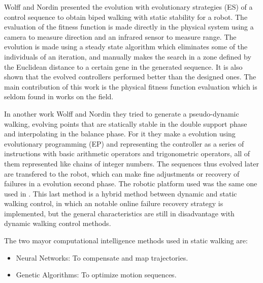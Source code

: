 Wolff and Nordin \cite{Wolff01Evolution} presented the evolution with
evolutionary strategies (ES) of a control sequence to obtain biped
walking with static stability for a robot. The evaluation of the
fitness function is made directly in the physical system using a
camera to measure direction and an infrared sensor to measure
range. The evolution is made using a steady state algorithm which
eliminates some of the individuals of an iteration, and manually makes
the search in a zone defined by the Euclidean distance to a certain
gene in the generated sequence. It is also shown that the evolved
controllers performed better than the designed ones. The main
contribution of this work is the physical fitness function evaluation
which is seldom found in works on the field.


In another work Wolff and Nordin \cite{Wolff03Learning} they tried to
generate a pseudo-dynamic walking, evolving points that are statically
stable in the double support phase and interpolating in the balance
phase. For it they make a evolution using evolutionary programming
(EP) and representing the controller as a series of instructions with
basic arithmetic operators and trigonometric operators, all of them
represented like chains of integer numbers. The sequences thus evolved
later are transfered to the robot, which can make fine adjustments or
recovery of failures in a evolution second phase. The robotic platform
used was the same one used in \cite{Wolff01Evolution}. This last
method is a hybrid method between dynamic and static walking control,
in which an notable online failure recovery strategy is implemented,
but the general characteristics are still in disadvantage with dynamic
walking control methods.

The two mayor computational intelligence methods used in static
walking are:
\begin{itemize}
\item Neural Networks: To compensate and map trajectories.
\item Genetic Algorithms: To optimize motion sequences.
\end{itemize}


